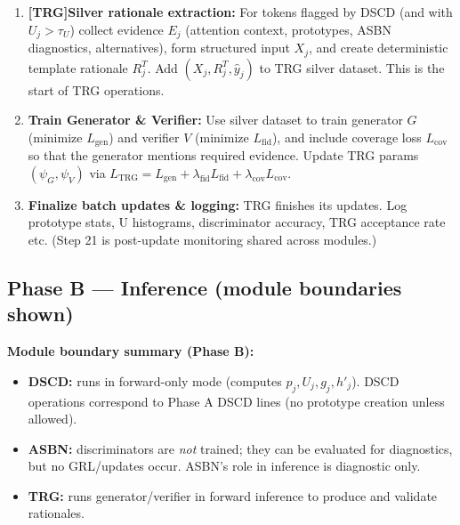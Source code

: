 \documentclass[11pt]{article}
\begin{document}
\begin{enumerate}
  \item \textbf{[TRG]Silver rationale extraction:} For tokens flagged by DSCD (and with $U_j>\tau_U$) collect evidence $E_j$ (attention context, prototypes, ASBN diagnostics, alternatives), form structured input $X_j$, and create deterministic template rationale $R_j^T$. Add $(X_j,R_j^T,\hat y_j)$ to TRG silver dataset. This is the start of TRG operations.
  
  \item \textbf{Train Generator \& Verifier:} Use silver dataset to train generator $G$ (minimize $L_{\text{gen}}$) and verifier $V$ (minimize $L_{\text{fid}}$), and include coverage loss $L_{\text{cov}}$ so that the generator mentions required evidence. Update TRG params $(\psi_G,\psi_V)$ via $L_{\text{TRG}}=L_{\text{gen}}+\lambda_{\text{fid}}L_{\text{fid}}+\lambda_{\text{cov}}L_{\text{cov}}$.
  
  \item \textbf{Finalize batch updates \& logging:} TRG finishes its updates. Log prototype stats, U histograms, discriminator accuracy, TRG acceptance rate etc. (Step 21 is post-update monitoring shared across modules.)
\end{enumerate}
\newpage
\subsection{Phase B — Inference (module boundaries shown)}
\textbf{Module boundary summary (Phase B):}
\begin{itemize}
  \item \textbf{DSCD:} runs in forward-only mode (computes $p_j,U_j,g_j,h'_j$). DSCD operations correspond to Phase A DSCD lines (no prototype creation unless allowed).
  \item \textbf{ASBN:} discriminators are \emph{not} trained; they can be evaluated for diagnostics, but no GRL/updates occur. ASBN's role in inference is diagnostic only.
  \item \textbf{TRG:} runs generator/verifier in forward inference to produce and validate rationales.
\end{itemize}
\end{document}
